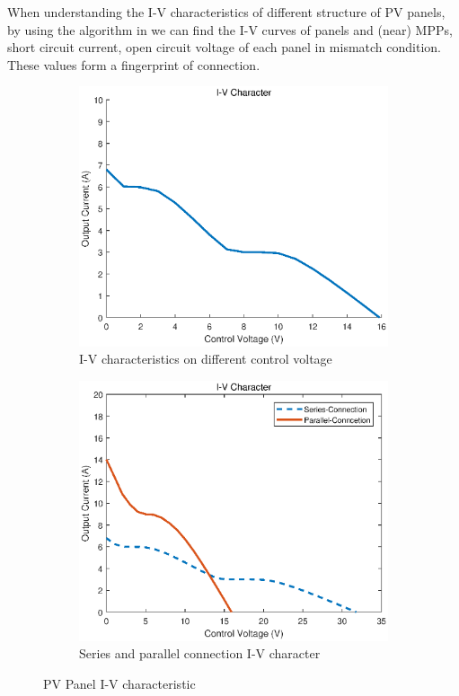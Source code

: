 \documentclass[conference]{IEEEtran}
\begin{document}
When understanding the I-V characteristics of different structure of PV panels, by using the algorithm in \cite{carotenuto2014online} we can find the I-V curves of panels and (near) MPPs, short circuit current, open circuit voltage of each panel in mismatch condition. These values form a fingerprint of connection.
\begin{figure}
     \centering
     \begin{subfigure}[b]{0.8\linewidth}
         \centering
         \includegraphics[width=\linewidth]{one-panel.eps}
         \caption{I-V characteristics on different control voltage}
         \label{one_panel}
     \end{subfigure}
     \hfill
     \begin{subfigure}[b]{0.8\linewidth}
         \centering
         \includegraphics[width=\linewidth]{ser-par.eps}
         \caption{Series and parallel connection I-V character}
         \label{ser-par}
     \end{subfigure}
        \caption{PV Panel I-V characteristic}
        \label{fig:three graphs}
\end{figure}
\end{document}
